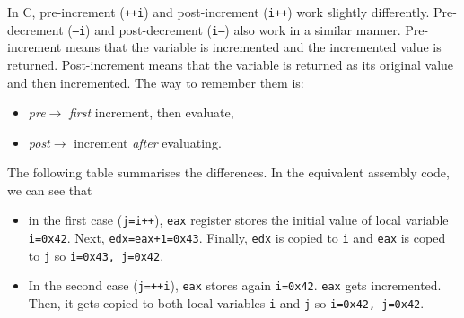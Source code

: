 \documentclass[a4paper]{article}
\begin{document}
In C, pre-increment (\texttt{++i}) and post-increment (\texttt{i++}) work slightly differently. Pre-decrement (\texttt{--i}) and post-decrement (\texttt{i--}) also work in a similar manner. Pre-increment means that the variable is incremented and the incremented value is returned. Post-increment means that the variable is returned as its original value and then incremented. The way to remember them is:
\begin{itemize}
    \item \textit{pre}$\rightarrow$ \textit{first} increment, then evaluate, 
    \item \textit{post}$\rightarrow$ increment \textit{after} evaluating.
\end{itemize}
The following table summarises the differences. In the equivalent assembly code, we can see that
\begin{itemize}
    \item in the first case (\texttt{j=i++}), \texttt{eax} register stores the initial value of local variable \texttt{i=0x42}. Next, \texttt{edx=eax+1=0x43}. Finally, \texttt{edx} is copied to \texttt{i} and \texttt{eax} is coped to \texttt{j} so \texttt{i=0x43, j=0x42}.
    \item In the second case (\texttt{j=++i}), \texttt{eax} stores again \texttt{i=0x42}. \texttt{eax} gets incremented. Then, it gets copied to both local variables \texttt{i} and \texttt{j} so \texttt{i=0x42, j=0x42}.
\end{itemize}
\end{document}
